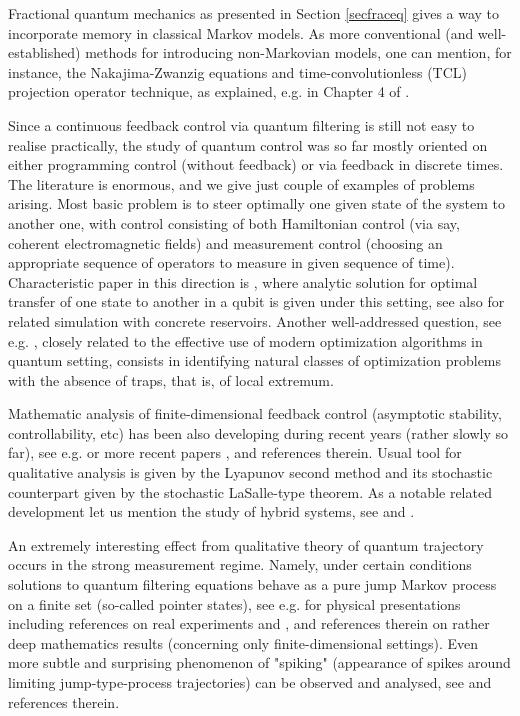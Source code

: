 \documentclass[12pt]{article}
\begin{document}
Fractional quantum mechanics as presented in Section \ref{secfraceq} gives
a way to incorporate memory in classical Markov models.
As more conventional (and well-established) methods for introducing non-Markovian models,
one can mention, for instance, the Nakajima-Zwanzig equations and time-convolutionless
(TCL) projection operator technique, as explained, e.g. in Chapter 4 of \cite{Breuer}.

 Since a continuous feedback control via quantum filtering is still not easy to realise practically,
 the study of quantum control was so far mostly oriented on either programming control (without feedback) or
via feedback in discrete times. The literature is enormous, and we give just couple of
examples of problems arising. Most basic problem is to steer optimally one given state of the system
to another one, with control consisting of both Hamiltonian control (via say, coherent electromagnetic fields)
and measurement control (choosing an appropriate sequence of operators to measure in given sequence of time).
Characteristic paper in this direction is \cite{Pechen}, where analytic solution for optimal transfer
of one state to another in a qubit is given under this setting, see also \cite{PechRab} for related simulation
with concrete reservoirs. Another well-addressed question, see e.g. \cite{RVP},
closely related to the effective use of modern optimization algorithms
in quantum setting, consists in identifying natural classes of optimization problems
with the absence of traps, that is, of local extremum.

Mathematic analysis of finite-dimensional feedback control (asymptotic stability, controllability, etc)
has been also developing during recent years (rather slowly so far), see e.g. \cite{VanHandelControl}
or more recent papers \cite{Liang19}, \cite{Liang22} and references therein.
Usual tool for qualitative analysis is given by the Lyapunov second method
and its stochastic counterpart given by the stochastic LaSalle-type theorem.
As a notable related development let us mention the study of hybrid systems,
see \cite{Barch24} and \cite{Dios}.

An extremely interesting effect from qualitative theory of quantum trajectory occurs
in the strong measurement regime. Namely, under certain conditions solutions to quantum
filtering equations behave as a pure jump Markov process on a finite set (so-called pointer states),
see e.g. \cite{Bauer} for physical presentations including references on real experiments and
 \cite{Ballesteros}, \cite{BenCedric} and references therein on rather deep mathematics results
 (concerning only finite-dimensional settings).
Even more subtle and surprising phenomenon of "spiking" (appearance of spikes around limiting
jump-type-process trajectories) can be observed and analysed, see \cite{Bernard} and references therein.
\end{document}

